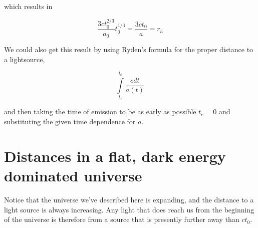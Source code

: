 \documentclass[12pt]{article}
\begin{document}
which results in 

\[ \frac{3ct_0^{2/3}}{a_0}t_0^{1/3} = \frac{3ct_0}{a}= r_h
\]

We could also get this result by using Ryden's formula for the proper distance to a lightsource,

\[ \int\limits_{t_e}^{t_0}\frac{cdt}{a(t)}
\]

and then taking the time of emission to be as early as possible \(t_e = 0\) and substituting the given time dependence for \(a\).

\section{Distances in a flat, dark energy dominated universe}

Notice that the universe we've described here is expanding, and the distance to a light source is always increasing. Any light that does reach us from the beginning of the universe is therefore from a source that is presently further away than \(ct_0\).
\end{document}
